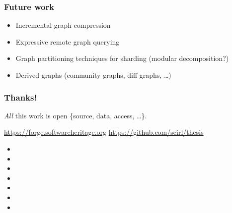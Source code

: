 \documentclass[aspectratio=169,xcolor=table]{beamer}
\begin{document}
    \begin{frame}
        \frametitle{Future work}

        \begin{block}{}
            \begin{itemize}
                \item Incremental graph compression
                \item Expressive remote graph querying
                \item Graph partitioning techniques for sharding (modular
                    decomposition?)
                \item Derived graphs (community graphs, diff graphs, …)
            \end{itemize}
        \end{block}
    \end{frame}

    \begin{frame}
        \frametitle{Thanks!}

        \begin{block}{}
            \emph{All} this work is open \{source, data, access, …\}.

            \url{https://forge.softwareheritage.org}
            \hfill
            \url{https://github.com/seirl/thesis}
        \end{block}

        \begin{block}{}
            \tiny
            \begin{itemize}
                \item {}
                \item {}
                \item {}
                \item {}
                \item {}
                \item {}
                \item {}
            \end{itemize}
        \end{block}
    \end{frame}
\end{document}
